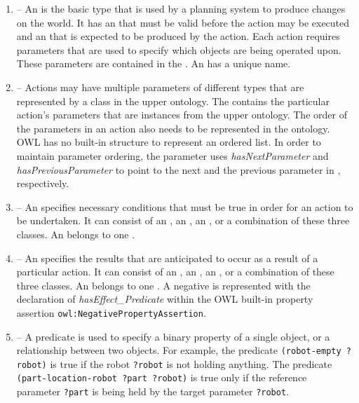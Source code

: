 \begin{enumerate}
\item {} -- An  is the basic type that is used by a planning system to produce changes on the world. It has an  that must be valid before the action may be executed and an  that is expected to be produced by the action. Each action requires parameters that are used to specify which objects are being operated upon. These parameters are contained in the . An  has a unique name.
%
\item {} -- Actions may have multiple parameters of different types that are represented by a class in the upper ontology. The  contains the particular action's parameters that are instances from the upper ontology. The order of the parameters in an  action also needs to be represented in the ontology. OWL has no built-in structure to represent an ordered list. In order to maintain parameter ordering, the parameter uses \emph{hasNextParameter} and \emph{hasPreviousParameter} to point to the next and the previous parameter in , respectively.
%
\item {} -- An  specifies necessary conditions that must be true in order for an action to be undertaken. It can consist of an , an , an , or a combination of these three classes. An  belongs to one .
%
\item {} -- An  specifies the results that are anticipated to occur as a result of a particular action. It can consist of an , an , an , or a combination of these three classes. An  belongs to one . A negative  is represented with the declaration of \emph{hasEffect\_Predicate} within the OWL built-in property assertion \texttt{owl:NegativePropertyAssertion}.
%
\item {} -- A predicate is used to specify a binary property of a single object, or a relationship between two objects. For example, the predicate \texttt{(robot-empty ?robot)} is true if the robot \texttt{?robot} is not holding anything. The predicate \texttt{(part-location-robot ?part ?robot)} is true only if the reference parameter \texttt{?part} is being held by the target parameter \texttt{?robot}.


\end{enumerate}
